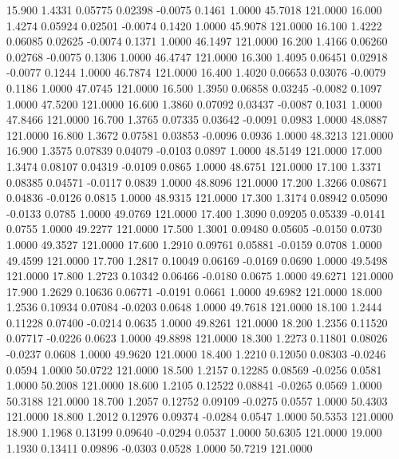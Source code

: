   15.900   1.4331   0.05775   0.02398  -0.0075   0.1461   1.0000  45.7018 121.0000
  16.000   1.4274   0.05924   0.02501  -0.0074   0.1420   1.0000  45.9078 121.0000
  16.100   1.4222   0.06085   0.02625  -0.0074   0.1371   1.0000  46.1497 121.0000
  16.200   1.4166   0.06260   0.02768  -0.0075   0.1306   1.0000  46.4747 121.0000
  16.300   1.4095   0.06451   0.02918  -0.0077   0.1244   1.0000  46.7874 121.0000
  16.400   1.4020   0.06653   0.03076  -0.0079   0.1186   1.0000  47.0745 121.0000
  16.500   1.3950   0.06858   0.03245  -0.0082   0.1097   1.0000  47.5200 121.0000
  16.600   1.3860   0.07092   0.03437  -0.0087   0.1031   1.0000  47.8466 121.0000
  16.700   1.3765   0.07335   0.03642  -0.0091   0.0983   1.0000  48.0887 121.0000
  16.800   1.3672   0.07581   0.03853  -0.0096   0.0936   1.0000  48.3213 121.0000
  16.900   1.3575   0.07839   0.04079  -0.0103   0.0897   1.0000  48.5149 121.0000
  17.000   1.3474   0.08107   0.04319  -0.0109   0.0865   1.0000  48.6751 121.0000
  17.100   1.3371   0.08385   0.04571  -0.0117   0.0839   1.0000  48.8096 121.0000
  17.200   1.3266   0.08671   0.04836  -0.0126   0.0815   1.0000  48.9315 121.0000
  17.300   1.3174   0.08942   0.05090  -0.0133   0.0785   1.0000  49.0769 121.0000
  17.400   1.3090   0.09205   0.05339  -0.0141   0.0755   1.0000  49.2277 121.0000
  17.500   1.3001   0.09480   0.05605  -0.0150   0.0730   1.0000  49.3527 121.0000
  17.600   1.2910   0.09761   0.05881  -0.0159   0.0708   1.0000  49.4599 121.0000
  17.700   1.2817   0.10049   0.06169  -0.0169   0.0690   1.0000  49.5498 121.0000
  17.800   1.2723   0.10342   0.06466  -0.0180   0.0675   1.0000  49.6271 121.0000
  17.900   1.2629   0.10636   0.06771  -0.0191   0.0661   1.0000  49.6982 121.0000
  18.000   1.2536   0.10934   0.07084  -0.0203   0.0648   1.0000  49.7618 121.0000
  18.100   1.2444   0.11228   0.07400  -0.0214   0.0635   1.0000  49.8261 121.0000
  18.200   1.2356   0.11520   0.07717  -0.0226   0.0623   1.0000  49.8898 121.0000
  18.300   1.2273   0.11801   0.08026  -0.0237   0.0608   1.0000  49.9620 121.0000
  18.400   1.2210   0.12050   0.08303  -0.0246   0.0594   1.0000  50.0722 121.0000
  18.500   1.2157   0.12285   0.08569  -0.0256   0.0581   1.0000  50.2008 121.0000
  18.600   1.2105   0.12522   0.08841  -0.0265   0.0569   1.0000  50.3188 121.0000
  18.700   1.2057   0.12752   0.09109  -0.0275   0.0557   1.0000  50.4303 121.0000
  18.800   1.2012   0.12976   0.09374  -0.0284   0.0547   1.0000  50.5353 121.0000
  18.900   1.1968   0.13199   0.09640  -0.0294   0.0537   1.0000  50.6305 121.0000
  19.000   1.1930   0.13411   0.09896  -0.0303   0.0528   1.0000  50.7219 121.0000
